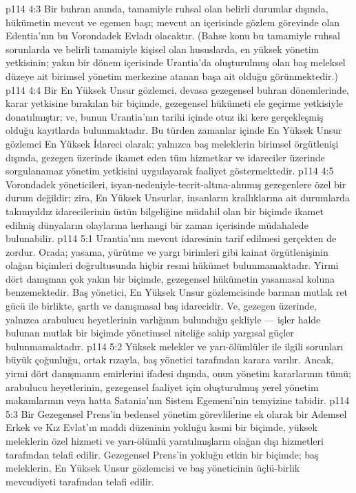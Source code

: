 \vs p114 4:3 Bir buhran anında, tamamiyle ruhsal olan belirli durumlar dışında, hükümetin mevcut ve egemen başı; mevcut an içerisinde gözlem görevinde olan Edentia’nın bu Vorondadek Evladı olacaktır. (Bahse konu bu tamamiyle ruhsal sorunlarda ve belirli tamamiyle kişisel olan hususlarda, en yüksek yönetim yetkisinin; yakın bir dönem içerisinde Urantia’da oluşturulmuş olan baş meleksel düzeye ait birimsel yönetim merkezine atanan başa ait olduğu görünmektedir.)
\vs p114 4:4 Bir En Yüksek Unsur gözlemci, devasa gezegensel buhran dönemlerinde, karar yetkisine bırakılan bir biçimde, gezegensel hükümeti ele geçirme yetkisiyle donatılmıştır; ve, bunun Urantia’nın tarihi içinde otuz iki kere gerçekleşmiş olduğu kayıtlarda bulunmaktadır. Bu türden zamanlar içinde En Yüksek Unsur gözlemci En Yüksek İdareci olarak; yalnızca baş meleklerin birimsel örgütlenişi dışında, gezegen üzerinde ikamet eden tüm hizmetkar ve idareciler üzerinde sorgulanamaz yönetim yetkisini uygulayarak faaliyet göstermektedir.
\vs p114 4:5 Vorondadek yöneticileri, isyan\hyp{}nedeniyle\hyp{}tecrit\hyp{}altına\hyp{}alınmış gezegenlere özel bir durum değildir; zira, En Yüksek Unsurlar, insanların krallıklarına ait durumlarda takımyıldız idarecilerinin üstün bilgeliğine müdahil olan bir biçimde ikamet edilmiş dünyaların olaylarına herhangi bir zaman içerisinde müdahalede bulunabilir.
\vs p114 5:1 Urantia’nın mevcut idaresinin tarif edilmesi gerçekten de zordur. Orada; yasama, yürütme ve yargı birimleri gibi kainat örgütlenişinin olağan biçimleri doğrultusunda hiçbir resmi hükümet bulunmamaktadır. Yirmi dört danışman çok yakın bir biçimde, gezegensel hükümetin yasamasal koluna benzemektedir. Baş yönetici, En Yüksek Unsur gözlemcisinde barınan mutlak ret gücü ile birlikte, şartlı ve danışmasal baş idarecidir. Ve, gezegen üzerinde, yalnızca arabulucu heyetlerinin varlığının bulunduğu şekliyle --- işler halde bulunan mutlak bir biçimde yönetimsel niteliğe sahip yargısal güçler bulunmamaktadır.
\vs p114 5:2 Yüksek melekler ve yarı\hyp{}ölümlüler ile ilgili sorunları büyük çoğunluğu, ortak rızayla, baş yönetici tarafından karara varılır. Ancak, yirmi dört danışmanın emirlerini ifadesi dışında, onun yönetim kararlarının tümü; arabulucu heyetlerinin, gezegensel faaliyet için oluşturulmuş yerel yönetim makamlarının veya hatta Satania’nın Sistem Egemeni’nin temyizine tabidir.
\vs p114 5:3 Bir Gezegensel Prens’in bedensel yönetim görevlilerine ek olarak bir Ademsel Erkek ve Kız Evlat’ın maddi düzeninin yokluğu kısmi bir biçimde, yüksek meleklerin özel hizmeti ve yarı\hyp{}ölümlü yaratılmışların olağan dışı hizmetleri tarafından telafi edilir. Gezegensel Prens’in yokluğu etkin bir biçimde; baş meleklerin, En Yüksek Unsur gözlemcisi ve baş yöneticinin üçlü\hyp{}birlik mevcudiyeti tarafından telafi edilir.
